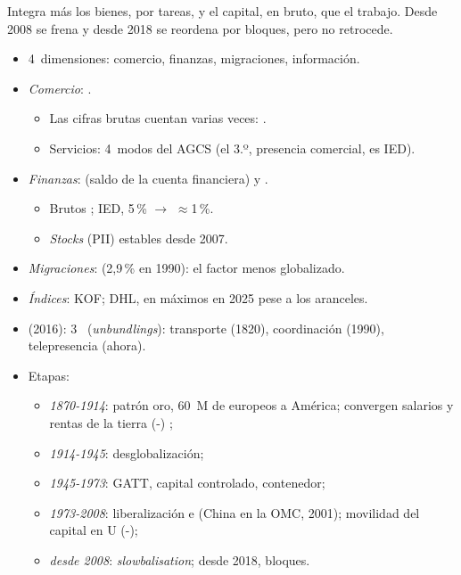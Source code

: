 \documentclass{article}
\begin{document}
\begin{columnas}
\begin{ideaclave}
Integra más los bienes, por tareas, y el capital, en bruto, que el trabajo. Desde 2008 se frena y desde 2018 se reordena por bloques, pero no retrocede.
\end{ideaclave}

\begin{itemize}
\item 4~dimensiones: comercio, finanzas, migraciones, información.
\item \emph{Comercio}: .
  \begin{itemize}
  \item Las cifras brutas cuentan varias veces:  .
  \item Servicios: 4~modos del AGCS (el 3.º, presencia comercial, es IED).
  \end{itemize}
\item \emph{Finanzas}:  (saldo de la cuenta financiera) y .
  \begin{itemize}
  \item Brutos ; IED, 5\,\% $\to$ $\approx$1\,\%.
  \item \emph{Stocks} (PII) estables desde 2007.
  \end{itemize}
\item \emph{Migraciones}:  (2,9\,\% en 1990): el factor menos globalizado.
\item \emph{Índices}: KOF; DHL, en máximos en 2025 pese a los aranceles.
\end{itemize}

\begin{itemize}
\item {} (2016): 3~ (\emph{unbundlings}): transporte (1820), coordinación (1990), telepresencia (ahora).
\item Etapas:
  \begin{itemize}
  \item \emph{1870-1914}: patrón oro, 60~M de europeos a América; convergen salarios y rentas de la tierra (-) ;
  \item \emph{1914-1945}: desglobalización;
  \item \emph{1945-1973}: GATT, capital controlado, contenedor;
  \item \emph{1973-2008}: liberalización e  (China en la OMC, 2001); movilidad del capital en U (-);
  \item \emph{desde 2008}: \emph{slowbalisation}; desde 2018, bloques.
  \end{itemize}
\end{itemize}


\end{columnas}
\end{document}
